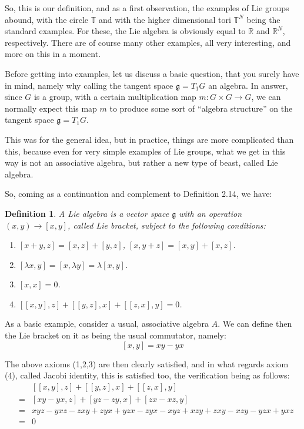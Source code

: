 \documentclass[12pt]{amsbook}
\newtheorem{definition}[theorem]{Definition}
\begin{document}
So, this is our definition, and as a first observation, the examples of Lie groups abound, with the circle $\mathbb T$ and with the higher dimensional tori $\mathbb T^N$ being the standard examples. For these, the Lie algebra is obviously equal to $\mathbb R$ and $\mathbb R^N$, respectively. There are of course many other examples, all very interesting, and more on this in a moment.

\bigskip

Before getting into examples, let us discuss a basic question, that you surely have in mind, namely why calling the tangent space $\mathfrak g=T_1G$ an algebra. In answer, since $G$ is a group, with a certain multiplication map $m:G\times G\to G$, we can normally expect this map $m$ to produce some sort of ``algebra structure'' on the tangent space $\mathfrak g=T_1G$.

\bigskip

This was for the general idea, but in practice, things are more complicated than this, because even for very simple examples of Lie groups, what we get in this way is not an associative algebra, but rather a new type of beast, called Lie algebra. 

\bigskip

So, coming as a continuation and complement to Definition 2.14, we have:


\begin{definition}
A Lie algebra is a vector space $\mathfrak g$ with an operation $(x,y)\to[x,y]$, called Lie bracket, subject to the following conditions:
\begin{enumerate}
\item $[x+y,z]=[x,z]+[y,z]$, $[x,y+z]=[x,y]+[x,z]$.

\item $[\lambda x,y]=[x,\lambda y]=\lambda[x,y]$.

\item $[x,x]=0$.

\item $[[x,y],z]+[[y,z],x]+[[z,x],y]=0$.
\end{enumerate}
\end{definition}

As a basic example, consider a usual, associative algebra $A$. We can define then the Lie bracket on it as being the usual commutator, namely:
$$[x,y]=xy-yx$$

The above axioms (1,2,3) are then clearly satisfied, and in what regards axiom (4), called Jacobi identity, this is satisfied too, the verification being as follows:
\begin{eqnarray*}
&&[[x,y],z]+[[y,z],x]+[[z,x],y]\\
&=&[xy-yx,z]+[yz-zy,x]+[zx-xz,y]\\
&=&xyz-yxz-zxy+zyx+yzx-zyx-xyz+xzy+zxy-xzy-yzx+yxz\\
&=&0
\end{eqnarray*}
\end{document}
